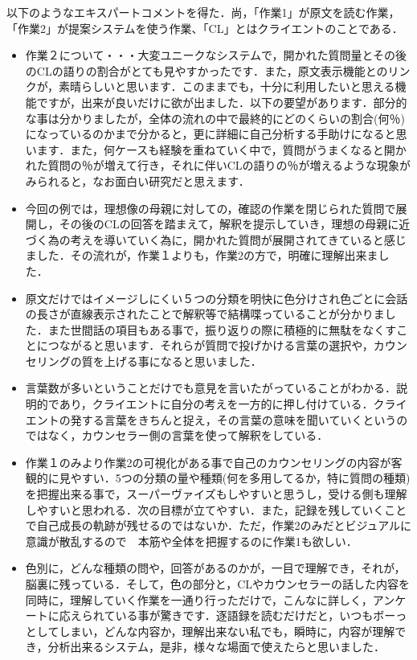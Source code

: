 \documentclass[shuuron]{kuee}
\begin{document}
以下のようなエキスパートコメントを得た．尚，「作業1」が原文を読む作業，「作業2」が提案システムを使う作業、「CL」とはクライエントのことである．
\begin{itemize}
  \item 作業２について・・・大変ユニークなシステムで，開かれた質問量とその後のCLの語りの割合がとても見やすかったです．また，原文表示機能とのリンクが，素晴らしいと思います．このままでも，十分に利用したいと思える機能ですが，出来が良いだけに欲が出ました．以下の要望があります．部分的な事は分かりましたが，全体の流れの中で最終的にどのくらいの割合(何％)になっているのかまで分かると，更に詳細に自己分析する手助けになると思います．また，何ケースも経験を重ねていく中で，質問がうまくなると開かれた質問の％が増えて行き，それに伴いCLの語りの％が増えるような現象がみられると，なお面白い研究だと思えます．

  \item 今回の例では，理想像の母親に対しての，確認の作業を閉じられた質問で展開し，その後のCLの回答を踏まえて，解釈を提示していき，理想の母親に近づく為の考えを導いていく為に，開かれた質問が展開されてきていると感じました．その流れが，作業１よりも，作業2の方で，明確に理解出来ました．
  \item 原文だけではイメージしにくい５つの分類を明快に色分けされ色ごとに会話の長さが直線表示されたことで解釈等で結構喋っていることが分かりました．また世間話の項目もある事で，振り返りの際に積極的に無駄をなくすことにつながると思います．それらが質問で投げかける言葉の選択や，カウンセリングの質を上げる事になると思いました．

  \item 言葉数が多いということだけでも意見を言いたがっていることがわかる．説明的であり，クライエントに自分の考えを一方的に押し付けている．クライエントの発する言葉をきちんと捉え，その言葉の意味を聞いていくというのではなく，カウンセラー側の言葉を使って解釈をしている．
  \item 作業１のみより作業2の可視化がある事で自己のカウンセリングの内容が客観的に見やすい．5つの分類の量や種類(何を多用してるか，特に質問の種類)を把握出来る事で，スーパーヴァイズもしやすいと思うし，受ける側も理解しやすいと思われる．次の目標が立てやすい．また，記録を残していくことで自己成長の軌跡が残せるのではないか．ただ，作業2のみだとビジュアルに意識が散乱するので　本筋や全体を把握するのに作業1も欲しい．
  \item 色別に，どんな種類の問や，回答があるのかが，一目で理解でき，それが，脳裏に残っている．そして，色の部分と，CLやカウンセラーの話した内容を同時に，理解していく作業を一通り行っただけで，こんなに詳しく，アンケートに応えられている事が驚きです．逐語録を読むだけだと，いつもボーっとしてしまい，どんな内容か，理解出来ない私でも，瞬時に，内容が理解でき，分析出来るシステム，是非，様々な場面で使えたらと思いました．

\end{itemize}
\end{document}
